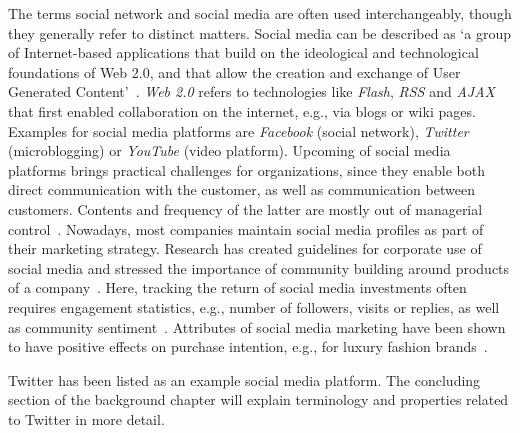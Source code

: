 The terms social network and social media are often used interchangeably, though
they generally refer to distinct matters.
Social media can be described as `a group of Internet-based applications that
build on the ideological and technological foundations of Web 2.0, and that allow
the creation and exchange of User Generated Content'~\cite[p. 61]{Kaplan2010}.
\textit{Web 2.0} refers to technologies like \textit{Flash}, \textit{RSS} and 
\textit{AJAX} that first enabled collaboration on the internet, e.g., via blogs
or wiki pages.
Examples for social media platforms are \textit{Facebook} (social network), 
\textit{Twitter} (microblogging) or \textit{YouTube} (video platform).
Upcoming of social media platforms brings practical challenges for organizations,
since they enable both direct communication with the customer, as well as
communication between customers.
Contents and frequency of the latter are mostly out of managerial control~\cite{Mangold2009}.
Nowadays, most companies maintain social media profiles as part of their
marketing strategy.
Research has created guidelines for corporate use of social media and stressed the
importance of community building around products of a company~\cite{Culnan2010}.
Here, tracking the return of social media investments often requires engagement
statistics, e.g., number of followers, visits or replies, as well as community
sentiment~\cite{Hoffman2010}.
Attributes of social media marketing have been shown to have positive effects
on purchase intention, e.g., for luxury fashion brands~\cite{Kim2012}.

Twitter has been listed as an example social media platform.
The concluding section of the background chapter will explain terminology
and properties related to Twitter in more detail.
